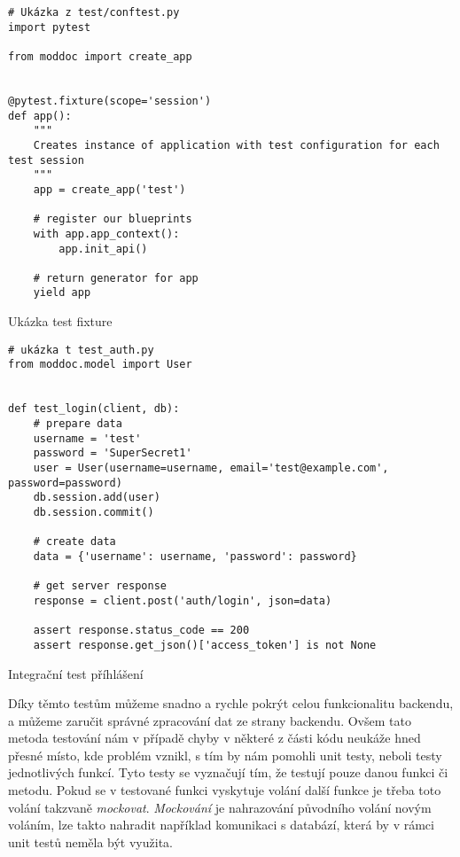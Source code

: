 \begin{listing}[h]
    \begin{verbatim}
# Ukázka z test/conftest.py
import pytest

from moddoc import create_app


@pytest.fixture(scope='session')
def app():
    """
    Creates instance of application with test configuration for each test session
    """
    app = create_app('test')

    # register our blueprints
    with app.app_context():
        app.init_api()

    # return generator for app
    yield app
    \end{verbatim}
    \caption{Ukázka test fixture}
    \label{lst:testFixture}
\end{listing}

\begin{listing}[h]
    \begin{verbatim}
# ukázka t test_auth.py
from moddoc.model import User


def test_login(client, db):
    # prepare data
    username = 'test'
    password = 'SuperSecret1'
    user = User(username=username, email='test@example.com', password=password)
    db.session.add(user)
    db.session.commit()

    # create data
    data = {'username': username, 'password': password}

    # get server response
    response = client.post('auth/login', json=data)

    assert response.status_code == 200
    assert response.get_json()['access_token'] is not None
    \end{verbatim}
    \caption{Integrační test příhlášení}
    \label{lst:authTest}
\end{listing}

Díky těmto testům můžeme snadno a rychle pokrýt celou funkcionalitu backendu, a můžeme zaručit správné zpracování dat ze strany backendu.
Ovšem tato metoda testování nám v případě chyby v některé z části kódu neukáže hned přesné místo, kde problém vznikl, s tím by nám pomohli
unit testy, neboli testy jednotlivých funkcí. Tyto testy se vyznačují tím, že testují pouze danou funkci či metodu. Pokud se v testované funkci
vyskytuje volání další funkce je třeba toto volání takzvaně \textit{mockovat}. \textit{Mockování} je nahrazování původního volání novým voláním,
lze takto nahradit například komunikaci s databází, která by v rámci unit testů neměla být využita.

